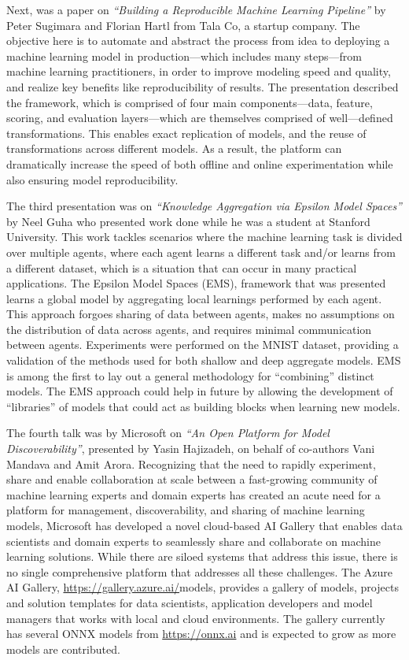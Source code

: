 \documentclass[11pt]{article}
\begin{document}
Next, was a paper on \emph{``Building a Reproducible Machine Learning Pipeline''} by Peter Sugimara and Florian Hartl from Tala Co, a startup company. The objective here is to automate and abstract the process from idea to deploying a machine learning model in production---which includes many steps---from machine learning practitioners, in order to improve modeling speed and quality, and realize key benefits like reproducibility of results. The presentation described the framework, which is comprised of four main components---data, feature, scoring, and evaluation layers---which are themselves comprised of well---defined transformations. This enables exact replication of models, and the reuse of transformations across different models. As a result, the platform can dramatically increase the speed of both offline and online experimentation while also ensuring model reproducibility.

The third presentation was on \emph{``Knowledge Aggregation via Epsilon Model Spaces''} by Neel Guha who presented work done while he was a student at Stanford University. This work tackles scenarios where the machine learning task is divided over multiple agents, where each agent learns a different task and/or learns from a different dataset, which is a situation that can occur in many practical applications.  The Epsilon Model Spaces (EMS), framework that was presented learns a global model by aggregating local learnings performed by each agent. This approach forgoes sharing of data between agents, makes no assumptions on the distribution of data across agents, and requires minimal communication between agents. Experiments were performed on the MNIST dataset, providing a validation of the methods used for both shallow and deep aggregate models. EMS is among the first to lay out a general methodology for ``combining'' distinct models. The EMS approach could help in future by allowing the development of ``libraries'' of models that could act as building blocks when learning new models.

The fourth talk was by Microsoft on \emph{``An Open Platform for Model Discoverability''}, presented by Yasin Hajizadeh, on behalf of co-authors Vani Mandava and Amit Arora.
Recognizing that the need to rapidly experiment, share and enable collaboration at scale between a fast-growing community of machine learning experts and domain experts has created an acute need for a platform for management, discoverability, and sharing of machine learning models, Microsoft has developed a novel cloud-based AI Gallery that enables data scientists and domain experts to seamlessly share and collaborate on machine learning solutions. While there are siloed systems that address this issue, there is no single comprehensive platform that addresses all these challenges. The Azure AI Gallery, \url{https://gallery.azure.ai/}models, provides a gallery of models, projects and solution templates for data scientists, application developers and model managers that works with local and cloud environments. The gallery currently has several ONNX models from \url{https://onnx.ai} and is expected to grow as more models are contributed. 
\end{document}
